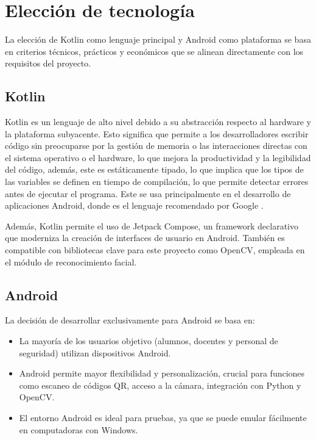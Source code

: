 
\section{Elección de tecnología}
La elección de Kotlin como lenguaje principal y Android como plataforma se basa en criterios técnicos, prácticos y económicos que se alinean directamente con los requisitos del proyecto.

\subsection{Kotlin}
Kotlin es un lenguaje de alto nivel debido a su abstracción respecto al hardware y la plataforma subyacente. Esto significa que permite a los desarrolladores escribir código sin preocuparse por la gestión de memoria o las interacciones directas con el sistema operativo o el hardware, lo que mejora la productividad y la legibilidad del código, además, este es estáticamente tipado, lo que implica que los tipos de las variables se definen en tiempo de compilación, lo que permite detectar errores antes de ejecutar el programa. Este se usa principalmente en el desarrollo de aplicaciones Android, donde es el lenguaje recomendado por Google \cite{CitaD14}.

Además, Kotlin permite el uso de Jetpack Compose, un framework declarativo que moderniza la creación de interfaces de usuario en Android. También es compatible con bibliotecas clave para este proyecto como OpenCV, empleada en el módulo de reconocimiento facial.

\subsection{Android}
La decisión de desarrollar exclusivamente para Android se basa en:

\begin{itemize}
	\item La mayoría de los usuarios objetivo (alumnos, docentes y personal de seguridad) utilizan dispositivos Android.
	
	\item Android permite mayor flexibilidad y personalización, crucial para funciones como escaneo de códigos QR, acceso a la cámara, integración con Python y OpenCV.
	
	\item El entorno Android es ideal para pruebas, ya que se puede emular fácilmente en computadoras con Windows.
\end{itemize}

